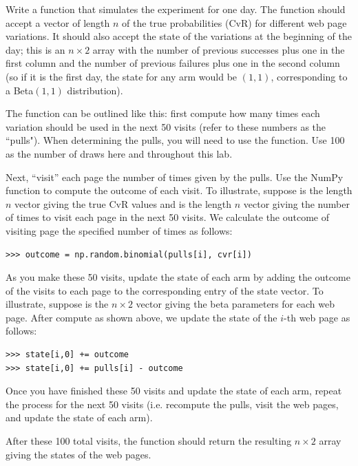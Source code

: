 \begin{problem}
Write a function  that simulates the experiment for one day.
The function should accept a vector of length $n$ of the true probabilities (CvR)
for different web page variations.  It should also accept the state of the variations
at the beginning of the day; this is an $n \times 2$ array with the number of previous
successes plus one in the first column and the number of previous failures plus one in
the second column (so if it is the first day, the state for any arm would be $(1,1)$,
corresponding to a Beta$(1,1)$ distribution).

The function can be outlined like this: first compute how many times each variation
should be used in the next 50 visits (refer to these numbers as the ``pulls").
When determining the pulls, you will need to use
the  function.  Use 100 as the number of draws here and throughout this lab.

Next, ``visit'' each page the number of times given by the pulls.
Use the NumPy function  to compute the outcome of each visit.
To illustrate, suppose  is the length $n$ vector giving the true CvR values
and  is the length $n$ vector giving the number of times to visit each page
in the next 50 visits. We calculate the outcome of visiting page  the
specified number of times as follows:
\begin{lstlisting}
>>> outcome = np.random.binomial(pulls[i], cvr[i])
\end{lstlisting}

As you make these 50 visits, update the state of each arm by adding the outcome of the visits
to each page to the corresponding entry of the state vector.
To illustrate, suppose  is the $n \times 2$ vector giving the beta parameters
for each web page. After compute  as shown above, we update the
state of the $i$-th web page as follows:
\begin{lstlisting}
>>> state[i,0] += outcome
>>> state[i,0] += pulls[i] - outcome
\end{lstlisting}

Once you have finished these 50 visits and update the state of each arm,
repeat the process for the next 50 visits (i.e. recompute the pulls,
visit the web pages, and update the state of each arm).

After these 100 total visits,
the function should return the resulting $n\times 2$ array giving the states of the web pages.
\end{problem}

